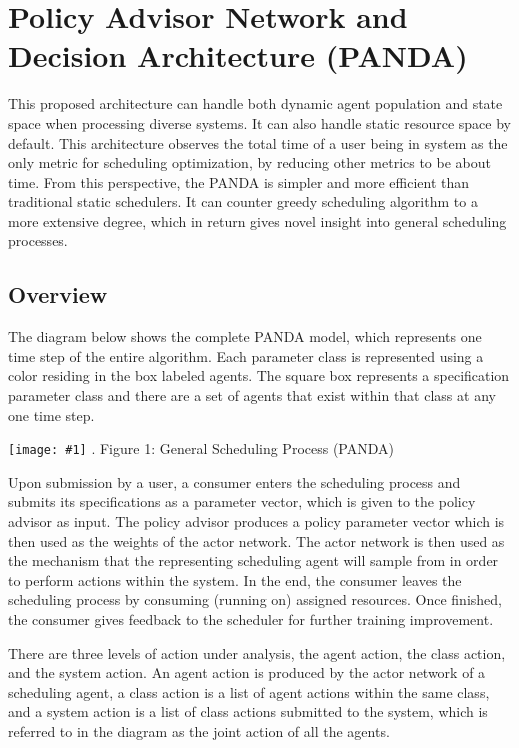 \documentclass{article}
\theoremstyle{definition}
\theoremstyle{remark}
\newcommand{\addpic}[1]{\texttt{[image: \#1]}}
\begin{document}
	\section{Policy Advisor Network and Decision Architecture (PANDA)}

	This proposed architecture can handle both dynamic agent population and state space when processing diverse systems. It can also handle static resource space by default. This architecture observes the total time of a user being in system as the only metric for scheduling optimization, by reducing other metrics to be about time. From this perspective, the PANDA is simpler and more efficient than traditional static schedulers. It can counter greedy scheduling algorithm to a more extensive degree, which in return gives novel insight into general scheduling processes.

		\subsection{Overview}

		The diagram below shows the complete PANDA model, which represents one time step of the entire algorithm. Each parameter class is represented using a color residing in the box labeled agents. The square box represents a specification parameter class and there are a set of agents that exist within that class at any one time step.
	
	 	  
	 	\addpic{figures/general_diagram}
	 	.\hspace{2cm}  Figure 1:  General Scheduling Process (PANDA)			
		

		Upon submission by a user, a consumer enters the scheduling process and submits its specifications as a parameter vector, which is given to the policy advisor as input. The policy advisor produces a policy parameter vector which is then used as the weights of the actor network. The actor network is then used as the mechanism that the representing scheduling agent will sample from in order to perform actions within the system. In the end, the consumer leaves the scheduling process by consuming (running on) assigned resources. Once finished, the consumer gives feedback to the scheduler for further training improvement.

		There are three levels of action under analysis, the agent action, the class action, and the system action. An agent action is produced by the actor network of a scheduling agent, a class action is a list of agent actions within the same class, and a system action is a list of class actions submitted to the system, which is referred to in the diagram as the joint action of all the agents.
\end{document}
